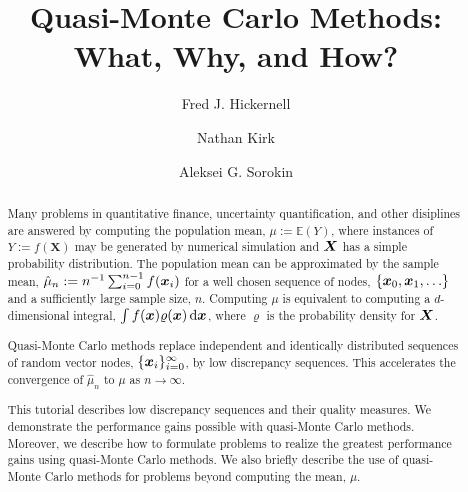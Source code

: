 \documentclass{svproc}
\begin{document}
\mainmatter              %
%
\title{Quasi-Monte Carlo Methods:  What, Why, and How?}
%
%
\author{Fred J. Hickernell \and Nathan Kirk \and Aleksei G. Sorokin}
%
%
%



\maketitle              %

\begin{abstract}
Many problems in  quantitative finance, uncertainty quantification, and other disiplines are answered by computing the population mean, $\mu := \mathbb{E}(Y)$, where instances of $Y:=f(\boldsymbol{X})$ may be generated by numerical simulation and ${\boldsymbol{X}}$ has a simple probability  distribution. The population mean can be approximated by the sample mean, $\hat{\mu}_n := n^{-1} \sum_{i=0}^{n-1} f({\boldsymbol{x}}_i)$ for a well chosen sequence of nodes, $\{{\boldsymbol{x}}_0, {\boldsymbol{x}}_1, \ldots\}$ and a sufficiently large sample size, $n$.  Computing $\mu$ is equivalent to computing a $d$-dimensional integral, $\int f({\boldsymbol{x}}) \varrho({\boldsymbol{x}}) \, \mathrm{d} {\boldsymbol{x}}$, where $\varrho$ is the probability density for ${\boldsymbol{X}}$.

Quasi-Monte Carlo methods replace independent and identically distributed  sequences of random vector nodes, $\{{\boldsymbol{x}}_i \}_{i = 0}^{\infty}$, by low discrepancy sequences.  This accelerates the convergence of $\hat{\mu}_n$ to $\mu$ as $n \to \infty$.

This tutorial describes  low discrepancy sequences  and their quality measures.  We demonstrate the performance gains possible with quasi-Monte Carlo methods.  Moreover, we describe how to formulate problems to realize the greatest performance gains using quasi-Monte Carlo methods.  We also briefly describe the use of quasi-Monte Carlo methods for problems beyond computing the mean, $\mu$.

\keywords{}
\end{abstract}
%
\setcounter{tocdepth}{2}
\tableofcontents
\end{document}
